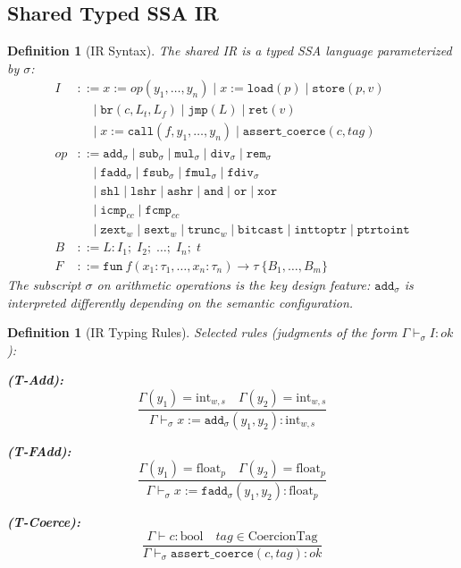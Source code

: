 \documentclass[11pt]{article}
\newtheorem{definition}[theorem]{Definition}
\newcommand{\SemConfig}{\sigma}
\begin{document}
\subsection{Shared Typed SSA IR}
\label{sec:ir}

\begin{definition}[IR Syntax]
\label{def:irsyntax}
The shared IR is a typed SSA language parameterized by $\SemConfig$:
\begin{align*}
I &::= x := \mathit{op}(y_1, \ldots, y_n) \mid x := \texttt{load}(p) \mid \texttt{store}(p, v) \\
  &\quad\mid \texttt{br}(c, L_t, L_f) \mid \texttt{jmp}(L) \mid \texttt{ret}(v) \\
  &\quad\mid x := \texttt{call}(f, y_1, \ldots, y_n) \mid \texttt{assert\_coerce}(c, \mathit{tag}) \\
\mathit{op} &::= \texttt{add}_\SemConfig \mid \texttt{sub}_\SemConfig \mid \texttt{mul}_\SemConfig \mid \texttt{div}_\SemConfig \mid \texttt{rem}_\SemConfig \\
    &\quad\mid \texttt{fadd}_\SemConfig \mid \texttt{fsub}_\SemConfig \mid \texttt{fmul}_\SemConfig \mid \texttt{fdiv}_\SemConfig \\
    &\quad\mid \texttt{shl} \mid \texttt{lshr} \mid \texttt{ashr} \mid \texttt{and} \mid \texttt{or} \mid \texttt{xor} \\
    &\quad\mid \texttt{icmp}_{cc} \mid \texttt{fcmp}_{cc} \\
    &\quad\mid \texttt{zext}_w \mid \texttt{sext}_w \mid \texttt{trunc}_w \mid \texttt{bitcast} \mid \texttt{inttoptr} \mid \texttt{ptrtoint} \\
B &::= L\!: I_1;\; I_2;\; \ldots;\; I_n;\; t \\
F &::= \texttt{fun}\ f(x_1\!:\!\tau_1, \ldots, x_n\!:\!\tau_n) \to \tau\ \{ B_1, \ldots, B_m \}
\end{align*}
The subscript $\SemConfig$ on arithmetic operations is the key design feature: $\texttt{add}_\SemConfig$ is interpreted differently depending on the semantic configuration.
\end{definition}

\begin{definition}[IR Typing Rules]
\label{def:irtyping}
Selected rules (judgments of the form $\Gamma \vdash_\SemConfig I : \mathit{ok}$):

\textbf{(T-Add):}
\[
\frac{\Gamma(y_1) = \mathrm{int}_{w,s} \quad \Gamma(y_2) = \mathrm{int}_{w,s}}
     {\Gamma \vdash_\SemConfig x := \texttt{add}_\SemConfig(y_1, y_2) : \mathrm{int}_{w,s}}
\]

\textbf{(T-FAdd):}
\[
\frac{\Gamma(y_1) = \mathrm{float}_p \quad \Gamma(y_2) = \mathrm{float}_p}
     {\Gamma \vdash_\SemConfig x := \texttt{fadd}_\SemConfig(y_1, y_2) : \mathrm{float}_p}
\]

\textbf{(T-Coerce):}
\[
\frac{\Gamma \vdash c : \mathrm{bool} \quad \mathit{tag} \in \mathrm{CoercionTag}}
     {\Gamma \vdash_\SemConfig \texttt{assert\_coerce}(c, \mathit{tag}) : \mathit{ok}}
\]
\end{definition}
\end{document}
